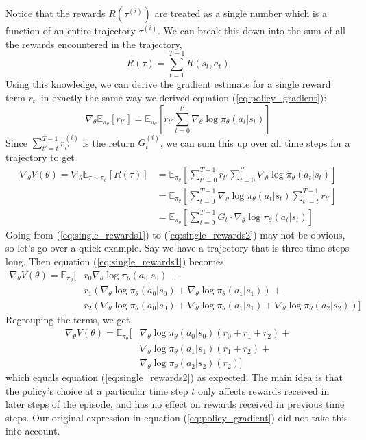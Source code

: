 \documentclass{article}
\newcommand{\E}{\mathbb{E}}                                        %
\begin{document}
Notice that the rewards $R(\tau^{(i)})$ are treated as a single number which is a function of an entire trajectory $\tau^{(i)}$. We can break this down into the sum of all the rewards encountered in the trajectory,
\[ R(\tau) = \sum_{t=1}^{T-1} R(s_t, a_t) \]
Using this knowledge, we can derive the gradient estimate for a single reward term $r_{t'}$ in exactly the same way we derived equation (\ref{eq:policy_gradient}):
\[
    \nabla_\theta \E_{\pi_\theta}[r_{t'}]
    = \E_{\pi_\theta} \left[ r_{t'} \sum_{t=0}^{t'} \nabla_\theta \log \pi_\theta(a_t | s_t) \right]
\]
Since $\sum_{t'= t}^{T-1} r_{t'}^{(i)}$ is the return $G_t^{(i)}$, we can sum this up over all time steps for a trajectory to get
\begin{align}
\nabla_\theta V(\theta)
= \nabla_\theta \E_{\tau \sim \pi_\theta} [R(\tau)]
&= \E_{\pi_\theta} \left[ \sum_{t'=0}^{T-1} r_{t'} \sum_{t=0}^{t'} \nabla_\theta \log \pi_\theta(a_t | s_t) \right] \label{eq:single_rewards1} \\
&= \E_{\pi_\theta} \left[ \sum_{t=0}^{T-1} \nabla_\theta \log \pi_\theta(a_t | s_t) \sum_{t'= t}^{T-1} r_{t'} \right] \label{eq:single_rewards2} \\
&= \E_{\pi_\theta} \left[ \sum_{t=0}^{T-1} G_t \cdot \nabla_\theta \log \pi_\theta(a_t | s_t) \right]
\end{align}
Going from (\ref{eq:single_rewards1}) to (\ref{eq:single_rewards2}) may not be obvious, so let's go over a quick example. Say we have a trajectory that is three time steps long. Then equation (\ref{eq:single_rewards1}) becomes
\begin{align*}
\nabla_\theta V(\theta) = \E_{\pi_\theta} \big[
&r_0 \nabla_\theta \log \pi_\theta(a_0|s_0) + \\
&r_1 (\nabla_\theta \log \pi_\theta(a_0|s_0) +
      \nabla_\theta \log \pi_\theta(a_1|s_1)) + \\
&r_2 (\nabla_\theta \log \pi_\theta(a_0|s_0)  +
      \nabla_\theta \log \pi_\theta(a_1|s_1)  +
      \nabla_\theta \log \pi_\theta(a_2|s_2)) \big]
\end{align*}
Regrouping the terms, we get
\begin{align*}
\nabla_\theta V(\theta) = \E_{\pi_\theta} \big[
&\nabla_\theta \log \pi_\theta(a_0|s_0) (r_0 + r_1 + r_2) + \\
&\nabla_\theta \log \pi_\theta(a_1|s_1) (r_1 + r_2) + \\
&\nabla_\theta \log \pi_\theta(a_2|s_2) (r_2) \big]
\end{align*}
which equals equation (\ref{eq:single_rewards2}) as expected. The main idea is that the policy's choice at a particular time step $t$ only affects rewards received in later steps of the episode, and has no effect on rewards received in previous time steps. Our original expression in equation (\ref{eq:policy_gradient}) did not take this into account.
\end{document}
